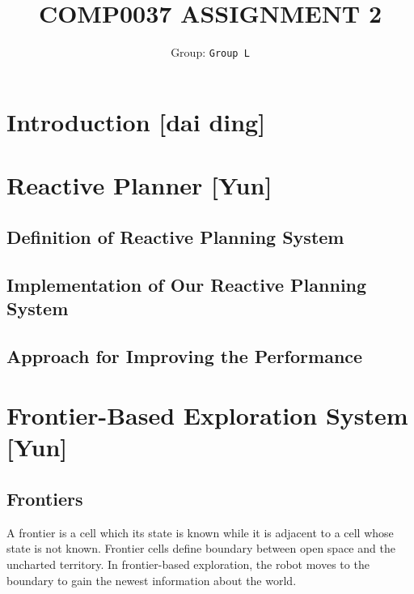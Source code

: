 \documentclass{article}
\title{COMP0037 ASSIGNMENT 2}
\author{
 Group: \texttt{Group L}\\
}
\date{}
\begin{document}
\maketitle



\section{Introduction [dai ding]} 

\section{Reactive Planner [Yun]}

\subsection {Definition of Reactive Planning System}

\subsection {Implementation of Our Reactive Planning System}

\subsection {Approach for Improving the Performance}

\section{Frontier-Based Exploration System [Yun]}

\subsection {Frontiers}

A frontier is a cell which its state is known while it is adjacent to a cell whose state is not known. Frontier cells define boundary between open space and the uncharted territory. In frontier-based exploration, the robot moves to the boundary to gain the newest information about the world.
\end{document}
